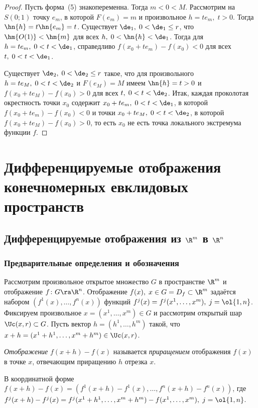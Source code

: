 \documentclass[a4paper]{article}
\newcommand{\emd}[1]{\emph{#1}}
\begin{document}
\begin{proof}
Пусть форма~(5) знакопеременна. Тогда $m<0<M$. Рассмотрим на
$S(0;1)$ точку $e_m$, в которой $F(e_m)=m$ и произвольное $h=te_m,
\; t>0$. Тогда $\hn{h} = t\hn{e_m}=t$. Существует $\de_1, \; 0<\de_1
\le r$, что $\hm{O(1)} < \hm{m}$ для всех $h, \; 0<\hn{h} < \de_1$.
Тогда для $h=te_m, \; 0<t<\de_1$, справедливо $f(x_0+te_m) - f(x_0)
< 0$ для всех $t, \; 0<t<\de_1$.

Существует $\de_2, \; 0<\de_2\le r$ такое, что для произвольного
$h=te_M, \; 0<t<\de_2$ и $F(e_M)=M$ имеем $\hn{h}=t>0$ и
$f(x_0+te_M)-f(x_0) > 0$ для всех $t, \; 0<t<\de_2$. Итак, каждая
проколотая окрестность точки $x_0$ содержит $x_0+te_m, \;
0<t<\de_1$, в которой $f(x_0+te_m) - f(x_0) < 0$ и точки $x_0+te_M,
\; 0<t<\de_2$, в которой $f(x_0+te_M) - f(x_0) > 0$, то есть $x_0$
не есть точка локального экстремума функции $f$.
\end{proof}

\newpage

\section{Дифференцируемые отображения конечномерных евклидовых пространств}

\subsection{ Дифференцируемые отображения из $\R^m$ в $\R^n$}

\subsubsection{ Предварительные определения и обозначения}

Рассмотрим произвольное открытое множество $G$ в пространстве $\R^m$
и отображение $f\colon G\ra\R^n$. Отображение $f(x), \; x\in
G=D_f\subset \R^m$ задаётся набором $(f^1(x),\ldots,f^n(x))$ функций
$f^j(x) = f^j(x^1,\ldots,x^m), \; j=\ol{1,n}$. Фиксируем
произвольное $x=(x^1,\ldots,x^m)\in G$ и рассмотрим открытый шар
$\Uc(x,r)\subset G$. Пусть вектор $h=(h^1,\ldots,h^m)$ такой, что
$x+h = (x^1+h^1,\ldots,x^m+h^m) \in \Uc(x,r)$.

\emph{Отображение} $f(x+h)-f(x)$ называется
\emd{приращением} отображения $f(x)$ в точке $x$,
отвечающим приращению $h$ отрезка $x$.

В координатной форме $f(x+h)-f(x) = (f^1(x+h)-f^1(x),\ldots,
f^n(x+h) - f^n(x))$, где $f^j(x+h)-f^j(x) = f^j(x^1+h^1,\ldots,
x^m+h^m) - f(x^1,\ldots,x^m), \; j=\ol{1,n}$.
\end{document}
